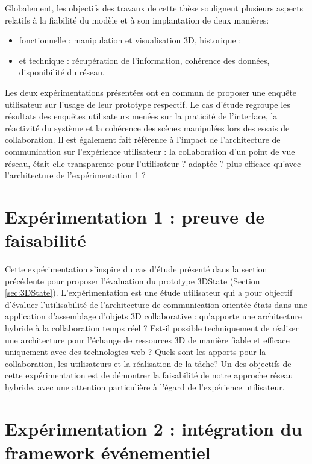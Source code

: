 Globalement, les objectifs des travaux de cette thèse soulignent plusieurs aspects relatifs à la fiabilité 
du modèle et à son implantation de deux manières: 
\begin{itemize}
	\item fonctionnelle : manipulation et visualisation 
	3D, historique ;
	\item et technique : récupération de l'information, cohérence des 
	données, disponibilité du réseau.
\end{itemize}

Les deux expérimentations présentées ont en commun de proposer une enquête 
utilisateur sur l'usage de leur prototype respectif. Le cas d'étude regroupe les 
résultats des enquêtes utilisateurs menées sur la praticité de l'interface, la réactivité du système et la cohérence des scènes manipulées lors des essais de collaboration. 
Il est également fait référence à l'impact de l'architecture de communication 
sur l'expérience utilisateur : la collaboration d'un point de vue réseau, était-elle 
transparente pour l'utilisateur ? adaptée ? plus efficace qu'avec l'architecture de 
l'expérimentation 1 ?




\section{Expérimentation 1 : preuve de faisabilité}
Cette expérimentation s'inspire du cas d'étude présenté dans la section 
précédente pour proposer l'évaluation du prototype 3DState (Section 
\ref{sec:3DState}). L'expérimentation est une étude utilisateur qui a pour objectif 
d'évaluer l'utilisabilité de l'architecture de communication \og orientée états\fg{} 
dans une application d'assemblage d'objets 3D collaborative : qu'apporte une 
architecture hybride à la 
collaboration temps réel ? Est-il possible techniquement de réaliser une 
architecture pour l'échange de ressources \gls{3D} de manière fiable et 
efficace uniquement avec des technologies web ? Quels sont les apports pour la 
collaboration, les utilisateurs et la réalisation de la tâche?
Un des objectifs de cette expérimentation est de démontrer la faisabilité de notre 
approche réseau hybride, avec une attention particulière à l'égard de l'expérience 
utilisateur.



\section{Expérimentation 2 : intégration du framework événementiel}
\label{sec:xp2}

